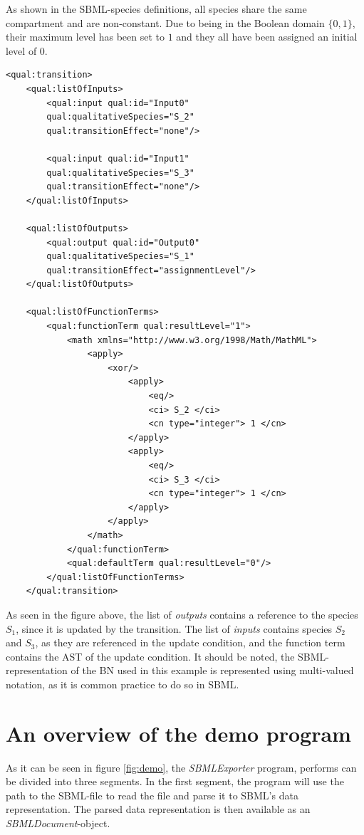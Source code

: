 As shown in the SBML-species definitions, all species share the same compartment and are non-constant. Due to being in the Boolean domain $\{0,1\}$, their maximum level has been set to $1$ and they all have been assigned an initial level of $0$.

\begin{lstlisting}[language=SBML, caption=The transition $F_1$ in SBML format]
<qual:transition>
	<qual:listOfInputs>
	    <qual:input qual:id="Input0"
	    qual:qualitativeSpecies="S_2"
	    qual:transitionEffect="none"/>
	    
	    <qual:input qual:id="Input1"
	    qual:qualitativeSpecies="S_3"
	    qual:transitionEffect="none"/>
	</qual:listOfInputs>
	
	<qual:listOfOutputs>
	    <qual:output qual:id="Output0"
	    qual:qualitativeSpecies="S_1"
	    qual:transitionEffect="assignmentLevel"/>
	</qual:listOfOutputs>
	
	<qual:listOfFunctionTerms>
	    <qual:functionTerm qual:resultLevel="1">
	        <math xmlns="http://www.w3.org/1998/Math/MathML">
	            <apply>
	                <xor/>
	                    <apply>
	                        <eq/>
	                        <ci> S_2 </ci>
	                        <cn type="integer"> 1 </cn>
                        </apply>
                        <apply>
                            <eq/>
                            <ci> S_3 </ci>
                            <cn type="integer"> 1 </cn>
                        </apply>
                    </apply>
                </math>
            </qual:functionTerm>
            <qual:defaultTerm qual:resultLevel="0"/>
        </qual:listOfFunctionTerms>
    </qual:transition>
\end{lstlisting}

As seen in the figure above, the list of \emph{outputs} contains a reference to the species $S_1$, since it is updated by the transition. The list of \emph{inputs} contains species $S_2$ and $S_3$, as they are referenced in the update condition, and the function term contains the AST of the update condition. It should be noted, the SBML-representation of the BN used in this example is represented using multi-valued notation, as it is common practice to do so in SBML.

\section{An overview of the demo program}
As it can be seen in figure \ref{fig:demo}, the \emph{SBMLExporter} program, performs can be divided into three segments. In the first segment, the program will use the path to the SBML-file to read the file and parse it to SBML's data representation. The parsed data representation is then available as an \emph{SBMLDocument}-object.

